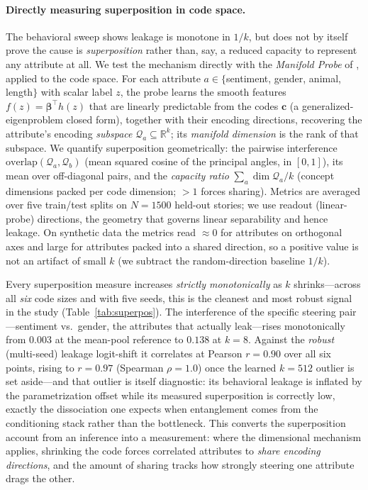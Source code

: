 \documentclass[11pt]{article}
\newcommand{\R}{\mathbb{R}}
\newcommand{\cb}{\bm{c}}
\begin{document}
\paragraph{Directly measuring superposition in code space.}
The behavioral sweep shows leakage is monotone in $1/k$, but does not by itself
prove the cause is \emph{superposition} rather than, say, a reduced capacity to
represent any attribute at all. We test the mechanism directly with the
\emph{Manifold Probe} of \cite{manifold2026}, applied to the code space. For each
attribute $a\in\{$sentiment, gender, animal, length$\}$ with scalar label $z$, the
probe learns the smooth features $f(z)=\bm\beta^\top h(z)$ that are linearly
predictable from the codes $\cb$ (a generalized-eigenproblem closed form), together
with their encoding directions, recovering the attribute's encoding \emph{subspace}
$\mathcal{Q}_a\subseteq\R^{k}$; its \emph{manifold dimension} is the rank of that
subspace. We quantify superposition geometrically: the pairwise interference
$\mathrm{overlap}(\mathcal{Q}_a,\mathcal{Q}_b)$ (mean squared cosine of the
principal angles, in $[0,1]$), its mean over off-diagonal pairs, and the
\emph{capacity ratio} $\sum_a \dim\mathcal{Q}_a / k$ (concept dimensions packed per
code dimension; $>1$ forces sharing). Metrics are averaged over five train/test
splits on $N{=}1500$ held-out stories; we use readout (linear-probe) directions,
the geometry that governs linear separability and hence leakage. On synthetic data
the metrics read $\approx 0$ for attributes on orthogonal axes and large for
attributes packed into a shared direction, so a positive value is not an artifact
of small $k$ (we subtract the random-direction baseline $1/k$).

Every superposition measure increases \emph{strictly monotonically} as $k$
shrinks---across all \emph{six} code sizes and with five seeds, this is the
cleanest and most robust signal in the study (Table~\ref{tab:superpos}). The
interference of the specific steering pair---sentiment vs.\ gender, the attributes
that actually leak---rises monotonically from $0.003$ at the mean-pool reference to
$0.138$ at $k{=}8$. Against the \emph{robust} (multi-seed) leakage logit-shift it
correlates at Pearson $r{=}0.90$ over all six points, rising to $r{=}0.97$
(Spearman $\rho{=}1.0$) once the learned $k{=}512$ outlier is set aside---and that
outlier is itself diagnostic: its behavioral leakage is inflated by the
parametrization offset while its measured superposition is correctly low, exactly
the dissociation one expects when entanglement comes from the conditioning stack
rather than the bottleneck. This converts the superposition account from an
inference into a measurement: where the dimensional mechanism applies, shrinking
the code forces correlated attributes to \emph{share encoding directions}, and the
amount of sharing tracks how strongly steering one attribute drags the other.
\end{document}
